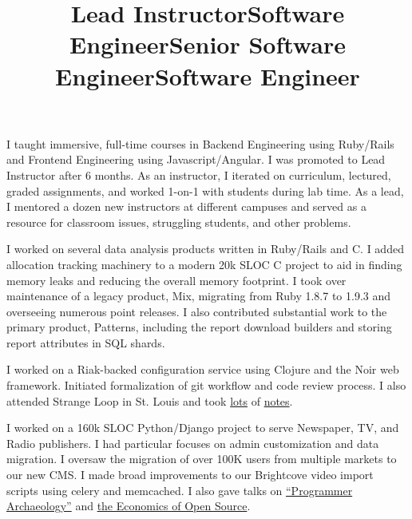 \documentclass[margintitle,line]{res}
\begin{document}
\begin{resume}
\title{Lead Instructor}
\begin{position}
  I taught immersive, full-time courses in Backend Engineering using Ruby/Rails and Frontend Engineering using Javascript/Angular.
  I was promoted to Lead Instructor after 6 months. As an instructor, I iterated
  on curriculum, lectured, graded assignments, and worked 1-on-1 with students
  during lab time. As a lead, I mentored a dozen new instructors at different
  campuses and served as a resource for classroom issues, struggling students,
  and other problems.
\end{position}

\title{Software Engineer}
\begin{position}
  I worked on several data analysis products written in Ruby/Rails and C.
  I added allocation tracking machinery to a modern 20k SLOC C project to aid
  in finding memory leaks and reducing the overall memory footprint. I took
  over maintenance of a legacy product, Mix, migrating from Ruby 1.8.7 to 1.9.3
  and overseeing numerous point releases. I also contributed substantial work
  to the primary product, Patterns, including the report download builders and
  storing report attributes in SQL shards.
\end{position}

\title{Senior Software Engineer}
\begin{position}
  I worked on a Riak-backed configuration service using Clojure and
  the Noir web framework. Initiated formalization of git
  workflow and code review process. I also attended Strange Loop in
  St. Louis and took
  \href{https://blog.kingcons.io/posts/Strange-Loop-Notes---Day-2.html}{lots}
  of
  \href{https://blog.kingcons.io/posts/Strange-Loop-Notes---Day-1.html}{notes}.
\end{position}

\title{Software Engineer}
\begin{position}
  I worked on a 160k SLOC Python/Django project to serve Newspaper,
  TV, and Radio publishers. I had particular focuses on admin
  customization and data migration. I oversaw the migration of over
  100K users from multiple markets to our new CMS.
  I made broad improvements to our Brightcove video import
  scripts using celery and memcached. I also gave talks on
  \href{http://redlinernotes.com/docs/talks/opa.html}{``Programmer
    Archaeology''} and
  \href{http://redlinernotes.com/docs/talks/wosw.html}{the Economics
    of Open Source}.
\end{position}


\end{resume}
\end{document}
